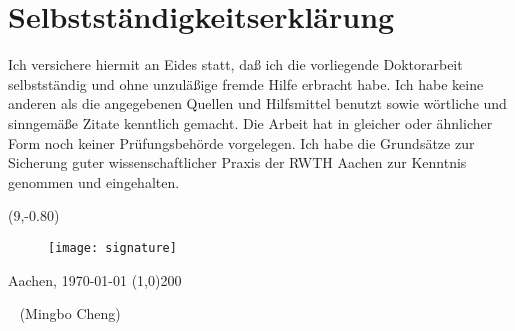 \chapter*{Selbstst\"andigkeitserkl\"arung}

\graphicspath{{preamble/figs}}

Ich versichere hiermit an Eides statt, da{\ss} ich die vorliegende Doktorarbeit selbstst\"andig und ohne unzul\"a{\ss}ige fremde Hilfe erbracht habe. Ich habe keine anderen als die angegebenen Quellen und \mbox{Hilfsmittel} benutzt sowie w\"ortliche und sinngem\"a{\ss}e Zitate kenntlich gemacht. Die Arbeit hat in \mbox{gleicher} oder \"ahnlicher Form noch keiner Pr\"ufungsbeh\"orde vorgelegen. Ich habe die Grunds\"atze zur Sicherung guter wissenschaftlicher Praxis der RWTH Aachen zur Kenntnis genommen und \linebreak eingehalten.

\vspace{2cm}

\begin{textblock}{3}(9,-0.80)
\begin{figure}[h!]
\texttt{[image: signature]}
\end{figure}
\end{textblock}

\hfill Aachen, \today \hspace{0.1cm} \line(1,0){200}

\ \hspace{9.3cm} (Mingbo Cheng)


